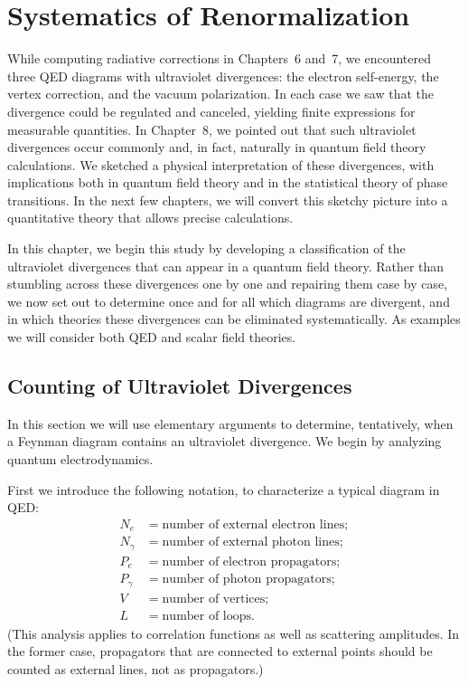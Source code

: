 \chapter{Systematics of Renormalization}

While computing radiative corrections in Chapters~6 and~7, we encountered
three QED diagrams with ultraviolet divergences: the electron self-energy, the
vertex correction, and the vacuum polarization.  In each case we saw that the
divergence could be regulated and canceled, yielding finite expressions for
measurable quantities.  In Chapter~8, we pointed out that such ultraviolet
divergences occur commonly and, in fact, naturally in quantum field theory
calculations.  We sketched a physical interpretation of these divergences, with
implications both in quantum field theory and in the statistical theory of
phase transitions.  In the next few chapters, we will convert this sketchy
picture into a quantitative theory that allows precise calculations.

In this chapter, we begin this study by developing a classification of the
ultraviolet divergences that can appear in a quantum field theory.  Rather
than stumbling across these divergences one by one and repairing them case by
case, we now set out to determine once and for all which diagrams are
divergent, and in which theories these divergences can be eliminated
systematically.  As examples we will consider both QED and scalar field
theories.

\section{Counting of Ultraviolet Divergences}

In this section we will use elementary arguments to determine, tentatively,
when a Feynman diagram contains an ultraviolet divergence.  We begin by
analyzing quantum electrodynamics.

First we introduce the following notation, to characterize a typical diagram
in QED:
\begin{equation}
  \begin{aligned}
    N_e &= \text{number of external electron lines};\\
    N_\gamma &= \text{number of external photon lines};\\
    P_e &= \text{number of electron propagators};\\
    P_\gamma &= \text{number of photon propagators};\\
    V &= \text{number of vertices};\\
    L &= \text{number of loops}.
  \end{aligned}
\end{equation}
(This analysis applies to correlation functions as well as scattering
amplitudes.  In the former case, propagators that are connected to external
points should be counted as external lines, not as propagators.)

